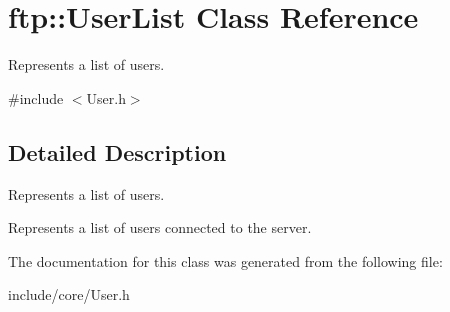 \hypertarget{classftp_1_1_user_list}{\section{ftp\-:\-:User\-List Class Reference}
\label{classftp_1_1_user_list}
}


Represents a list of users.  




{\ttfamily \#include $<$User.\-h$>$}



\subsection{Detailed Description}
Represents a list of users. 

Represents a list of users connected to the server. 

The documentation for this class was generated from the following file\-:\begin{DoxyCompactItemize}
\item 
include/core/User.\-h\end{DoxyCompactItemize}
